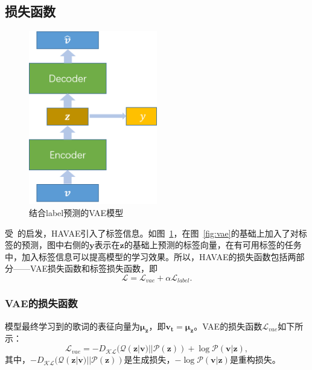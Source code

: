 \subsection{损失函数}
\begin{figure}[h]
  \centering
  \includegraphics[width=0.5\textwidth]{label_vae.png}
  \caption{结合label预测的VAE模型}
  \label{fig:label_vae}
\end{figure}
受~\cite{Kingma2014Semi}的启发，HAVAE引入了标签信息。如图~\ref{fig:label_vae}，在图~\ref{fig:vae}的基础上加入了对标签的预测，图中右侧的$\bm y$表示在$\bm z$的基础上预测的标签向量，在有可用标签的任务中，加入标签信息可以提高模型的学习效果。所以，HAVAE的损失函数包括两部分——VAE损失函数和标签损失函数，即
\begin{equation}
\label{eq:loss}
\mathcal L= \mathcal L_{vae}+\alpha\mathcal L_{label}.
\end{equation}
\par


\subsubsection{VAE的损失函数}
模型最终学习到的歌词的表征向量为$\bm{\mu_z}$，即$\bm{v_t} = \bm{\mu_z}$。VAE的损失函数$\mathcal L_{vae}$如下所示：
\begin{equation}
    \mathcal{L}_{vae}=-D_{\mathcal{KL}}(\mathcal{Q}(\bm z|\bm v)||\mathcal{P}(\bm z))+\log\mathcal{P}(\bm v|\bm z),
\end{equation}
其中，$-D_{\mathcal{KL}}(\mathcal{Q}(\bm z|\bm v)||\mathcal{P}(\bm z))$是生成损失，$-\log\mathcal{P}(\bm v|\bm z)$是重构损失。\par

